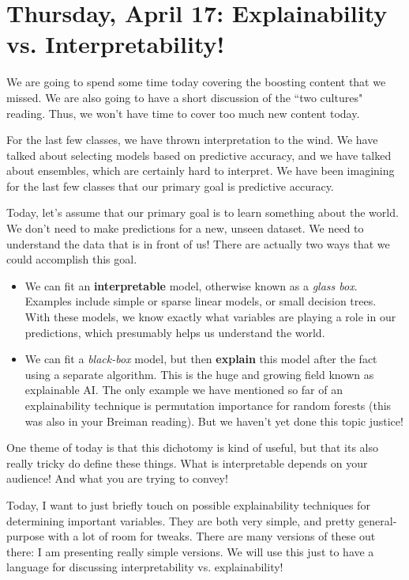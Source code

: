\newpage
\section{Thursday, April 17: Explainability vs. Interpretability!}

We are going to spend some time today covering the boosting content that we missed. We are also going to have a short discussion of the ``two cultures" reading. Thus, we won't have time to cover too much new content today. 

For the last few classes, we have thrown interpretation to the wind. We have talked about selecting models based on predictive accuracy, and we have talked about ensembles, which are certainly hard to interpret. We have been imagining for the last few classes that our primary goal is predictive accuracy.

Today, let's assume that our primary goal is to learn something about the world. We don't need to make predictions for a new, unseen dataset. We need to understand the data that is in front of us! There are actually two ways that we could accomplish this goal. 

\begin{itemize}
\item We can fit an \textbf{interpretable} model, otherwise known as a \emph{glass box}. Examples include simple or sparse linear models, or small decision trees. With these models, we know exactly what variables are playing a role in our predictions, which presumably helps us understand the world.
\item We can fit a \emph{black-box} model, but then \textbf{explain} this model after the fact using a separate algorithm. This is the huge and growing field known as explainable AI. The only example we have mentioned so far of an explainability technique is permutation importance for random forests (this was also in your Breiman reading). But we haven't yet done this topic justice!
\end{itemize}

One theme of today is that this dichotomy is kind of useful, but that its also really tricky do define these things. What is interpretable depends on your audience! And what you are trying to convey!

Today, I want to just briefly touch on possible explainability techniques for determining important variables. They are both very simple, and pretty general-purpose with a lot of room for tweaks. There are many versions of these out there: I am presenting really simple versions. We will use this just to have a language for discussing interpretability vs. explainability! 

